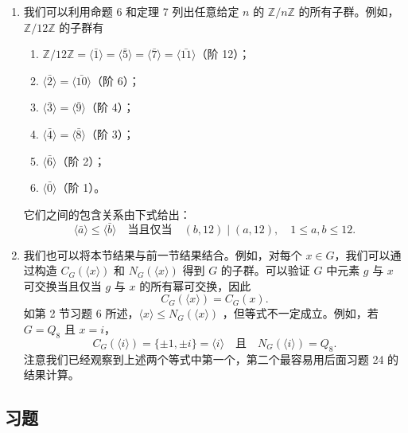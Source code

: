 \begin{example}
\begin{enumerate}[label=(\arabic*)]
\item 我们可以利用命题 6 和定理 7 列出任意给定 \(n\) 的 \(\mathbb{Z}/n\mathbb{Z}\) 的所有子群。例如，\(\mathbb{Z}/12\mathbb{Z}\) 的子群有
\begin{enumerate}[label=(\alph*)]
\item \(\mathbb{Z}/12\mathbb{Z} = \langle \bar{1} \rangle = \langle \bar{5} \rangle = \langle \bar{7} \rangle = \langle \bar{11} \rangle\)（阶 12）；
\item \(\langle \bar{2} \rangle = \langle \bar{10} \rangle\)（阶 6）；
\item \(\langle \bar{3} \rangle = \langle \bar{9} \rangle\)（阶 4）；
\item \(\langle \bar{4} \rangle = \langle \bar{8} \rangle\)（阶 3）；
\item \(\langle \bar{6} \rangle\)（阶 2）；
\item \(\langle \bar{0} \rangle\)（阶 1）。
\end{enumerate}
它们之间的包含关系由下式给出：
\[
\langle \bar{a} \rangle \leq \langle \bar{b} \rangle \quad \text{当且仅当} \quad (b, 12) \mid (a, 12), \quad 1 \leq a, b \leq 12.
\]

\item 我们也可以将本节结果与前一节结果结合。例如，对每个 \(x \in G\)，我们可以通过构造 \(C_G(\langle x \rangle)\) 和 \(N_G(\langle x \rangle)\) 得到 \(G\) 的子群。可以验证 \(G\) 中元素 \(g\) 与 \(x\) 可交换当且仅当 \(g\) 与 \(x\) 的所有幂可交换，因此
\[
C_G(\langle x \rangle) = C_G(x).
\]
如第 2 节习题 6 所述，\(\langle x \rangle \leq N_G(\langle x \rangle)\) ，但等式不一定成立。例如，若 \(G = Q_8\) 且 \(x = i\)，
\[
C_G(\langle i \rangle) = \{\pm 1, \pm i\} = \langle i \rangle \quad \text{且} \quad N_G(\langle i \rangle) = Q_8.
\]
注意我们已经观察到上述两个等式中第一个，第二个最容易用后面习题 24 的结果计算。
\end{enumerate}
\end{example}

\subsection*{习题}

